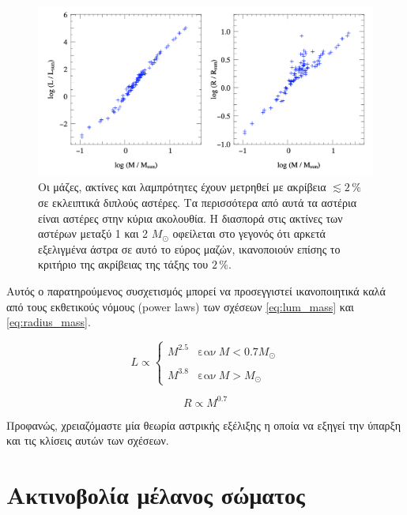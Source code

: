 \begin{figure}[h]
    \centering
    \includegraphics[width=\linewidth]{Figures/luminosity_mass_relation.png}
    \caption{Οι μάζες, ακτίνες και λαμπρότητες έχουν μετρηθεί με ακρίβεια $\lesssim 2 \,\%$ σε εκλειπτικά διπλούς αστέρες. Τα περισσότερα από αυτά τα αστέρια είναι αστέρες στην κύρια ακολουθία. Η διασπορά στις ακτίνες των αστέρων μεταξύ 1 και 2 $M_{\odot}$ οφείλεται στο γεγονός ότι αρκετά εξελιγμένα άστρα σε αυτό το εύρος μαζών, ικανοποιούν επίσης το κριτήριο της ακρίβειας της τάξης του $2 \,\%$.}
    \label{fig:luminosity_mass_relation}
\end{figure}

Αυτός ο παρατηρούμενος συσχετισμός μπορεί να προσεγγιστεί ικανοποιητικά καλά από τους εκθετικούς νόμους (power laws) των σχέσεων \eqref{eq:lum_mass} και \eqref{eq:radius_mass}.

\begin{equation}
    \label{eq:lum_mass}
    L \propto 
    \begin{cases}
        M^{2.5} & \text{εαν} \ M < 0.7 M_{\odot} \\\\
        M^{3.8} & \text{εαν} \ M > M_{\odot}
    \end{cases}
\end{equation}

\begin{equation}
    \label{eq:radius_mass}
    R \propto M^{0.7}
\end{equation}

Προφανώς, χρειαζόμαστε μία θεωρία αστρικής εξέλιξης η οποία να εξηγεί την ύπαρξη και τις κλίσεις αυτών των σχέσεων.


\section{Ακτινοβολία μέλανος σώματος}

